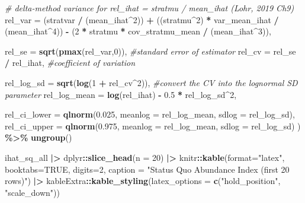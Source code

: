 \documentclass[
]{article}
\newenvironment{Shaded}{\begin{snugshade}}{\end{snugshade}}
\newcommand{\AttributeTok}[1]{\textcolor[rgb]{0.13,0.29,0.53}{#1}}
\newcommand{\CommentTok}[1]{\textcolor[rgb]{0.56,0.35,0.01}{\textit{#1}}}
\newcommand{\ConstantTok}[1]{\textcolor[rgb]{0.56,0.35,0.01}{#1}}
\newcommand{\DecValTok}[1]{\textcolor[rgb]{0.00,0.00,0.81}{#1}}
\newcommand{\FloatTok}[1]{\textcolor[rgb]{0.00,0.00,0.81}{#1}}
\newcommand{\FunctionTok}[1]{\textcolor[rgb]{0.13,0.29,0.53}{\textbf{#1}}}
\newcommand{\NormalTok}[1]{#1}
\newcommand{\SpecialCharTok}[1]{\textcolor[rgb]{0.81,0.36,0.00}{\textbf{#1}}}
\newcommand{\StringTok}[1]{\textcolor[rgb]{0.31,0.60,0.02}{#1}}
\begin{document}
\begin{Shaded}
\begin{Highlighting}[]
    \CommentTok{\# delta{-}method variance for rel\_ihat = stratmu / mean\_ihat (Lohr, 2019 Ch9)}
    \AttributeTok{rel\_var =}
\NormalTok{      (stratvar }\SpecialCharTok{/}\NormalTok{ (mean\_ihat}\SpecialCharTok{\^{}}\DecValTok{2}\NormalTok{)) }\SpecialCharTok{+}
\NormalTok{      ((stratmu}\SpecialCharTok{\^{}}\DecValTok{2}\NormalTok{) }\SpecialCharTok{*}\NormalTok{ var\_mean\_ihat }\SpecialCharTok{/}\NormalTok{ (mean\_ihat}\SpecialCharTok{\^{}}\DecValTok{4}\NormalTok{)) }\SpecialCharTok{{-}}
\NormalTok{      (}\DecValTok{2} \SpecialCharTok{*}\NormalTok{ stratmu }\SpecialCharTok{*}\NormalTok{ cov\_stratmu\_mean }\SpecialCharTok{/}\NormalTok{ (mean\_ihat}\SpecialCharTok{\^{}}\DecValTok{3}\NormalTok{)),}

    \AttributeTok{rel\_se =} \FunctionTok{sqrt}\NormalTok{(}\FunctionTok{pmax}\NormalTok{(rel\_var,}\DecValTok{0}\NormalTok{)), }\CommentTok{\#standard error of estimator}
    \AttributeTok{rel\_cv =}\NormalTok{ rel\_se }\SpecialCharTok{/}\NormalTok{ rel\_ihat, }\CommentTok{\#coefficient of variation}
  
    \AttributeTok{rel\_log\_sd =} \FunctionTok{sqrt}\NormalTok{(}\FunctionTok{log}\NormalTok{(}\DecValTok{1} \SpecialCharTok{+}\NormalTok{ rel\_cv}\SpecialCharTok{\^{}}\DecValTok{2}\NormalTok{)), }\CommentTok{\#convert the CV into the lognormal SD parameter}
    \AttributeTok{rel\_log\_mean =} \FunctionTok{log}\NormalTok{(rel\_ihat) }\SpecialCharTok{{-}} \FloatTok{0.5} \SpecialCharTok{*}\NormalTok{ rel\_log\_sd}\SpecialCharTok{\^{}}\DecValTok{2}\NormalTok{, }

    \AttributeTok{rel\_ci\_lower =} \FunctionTok{qlnorm}\NormalTok{(}\FloatTok{0.025}\NormalTok{, }\AttributeTok{meanlog =}\NormalTok{ rel\_log\_mean, }\AttributeTok{sdlog =}\NormalTok{ rel\_log\_sd),}
    \AttributeTok{rel\_ci\_upper =} \FunctionTok{qlnorm}\NormalTok{(}\FloatTok{0.975}\NormalTok{, }\AttributeTok{meanlog =}\NormalTok{ rel\_log\_mean, }\AttributeTok{sdlog =}\NormalTok{ rel\_log\_sd)}
\NormalTok{  ) }\SpecialCharTok{\%\textgreater{}\%}
    \FunctionTok{ungroup}\NormalTok{()}

\NormalTok{ihat\_sq\_all }\SpecialCharTok{|\textgreater{}} 
\NormalTok{  dplyr}\SpecialCharTok{::}\FunctionTok{slice\_head}\NormalTok{(}\AttributeTok{n =} \DecValTok{20}\NormalTok{) }\SpecialCharTok{|\textgreater{}}
\NormalTok{  knitr}\SpecialCharTok{::}\FunctionTok{kable}\NormalTok{(}\AttributeTok{format=}\StringTok{"latex"}\NormalTok{, }\AttributeTok{booktabs=}\ConstantTok{TRUE}\NormalTok{, }\AttributeTok{digits=}\DecValTok{2}\NormalTok{,}
              \AttributeTok{caption =} \StringTok{"Status Quo Abundance Index (first 20 rows)"}\NormalTok{) }\SpecialCharTok{|\textgreater{}}
\NormalTok{  kableExtra}\SpecialCharTok{::}\FunctionTok{kable\_styling}\NormalTok{(}\AttributeTok{latex\_options =} \FunctionTok{c}\NormalTok{(}\StringTok{"hold\_position"}\NormalTok{, }\StringTok{"scale\_down"}\NormalTok{))}
\end{Highlighting}
\end{Shaded}
\end{document}
